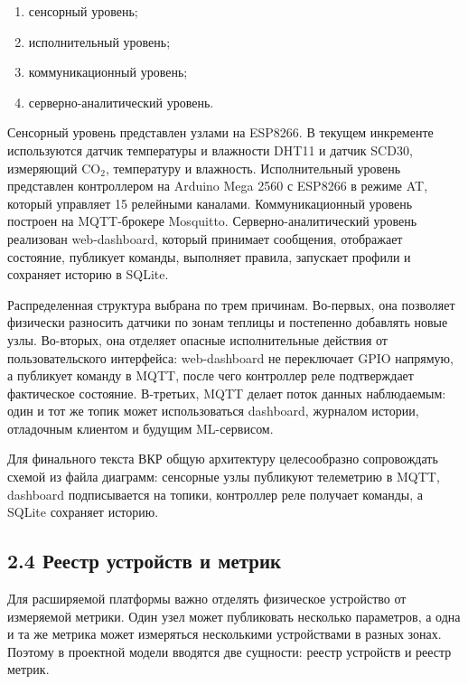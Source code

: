 \documentclass[a4paper,14pt]{extarticle}
\providecommand{\tightlist}{%
  \setlength{\itemsep}{0pt}\setlength{\parskip}{0pt}}
\begin{document}
\begin{enumerate}
\def\labelenumi{\arabic{enumi})}
\tightlist
\item
  сенсорный уровень;
\item
  исполнительный уровень;
\item
  коммуникационный уровень;
\item
  серверно-аналитический уровень.
\end{enumerate}

Сенсорный уровень представлен узлами на ESP8266. В текущем инкременте
используются датчик температуры и влажности DHT11 и датчик SCD30,
измеряющий CO\(_2\), температуру и влажность. Исполнительный уровень
представлен контроллером на Arduino Mega 2560 с ESP8266 в режиме AT,
который управляет 15 релейными каналами. Коммуникационный уровень
построен на MQTT-брокере Mosquitto. Серверно-аналитический уровень
реализован web-dashboard, который принимает сообщения, отображает
состояние, публикует команды, выполняет правила, запускает профили и
сохраняет историю в SQLite.

Распределенная структура выбрана по трем причинам. Во-первых, она
позволяет физически разносить датчики по зонам теплицы и постепенно
добавлять новые узлы. Во-вторых, она отделяет опасные исполнительные
действия от пользовательского интерфейса: web-dashboard не переключает
GPIO напрямую, а публикует команду в MQTT, после чего контроллер реле
подтверждает фактическое состояние. В-третьих, MQTT делает поток данных
наблюдаемым: один и тот же топик может использоваться dashboard,
журналом истории, отладочным клиентом и будущим ML-сервисом.

Для финального текста ВКР общую архитектуру целесообразно сопровождать
схемой из файла диаграмм: сенсорные узлы публикуют телеметрию в MQTT,
dashboard подписывается на топики, контроллер реле получает команды, а
SQLite сохраняет историю.

\subsection{2.4 Реестр устройств и
метрик}\label{ux440ux435ux435ux441ux442ux440-ux443ux441ux442ux440ux43eux439ux441ux442ux432-ux438-ux43cux435ux442ux440ux438ux43a}

Для расширяемой платформы важно отделять физическое устройство от
измеряемой метрики. Один узел может публиковать несколько параметров, а
одна и та же метрика может измеряться несколькими устройствами в разных
зонах. Поэтому в проектной модели вводятся две сущности: реестр
устройств и реестр метрик.
\end{document}
